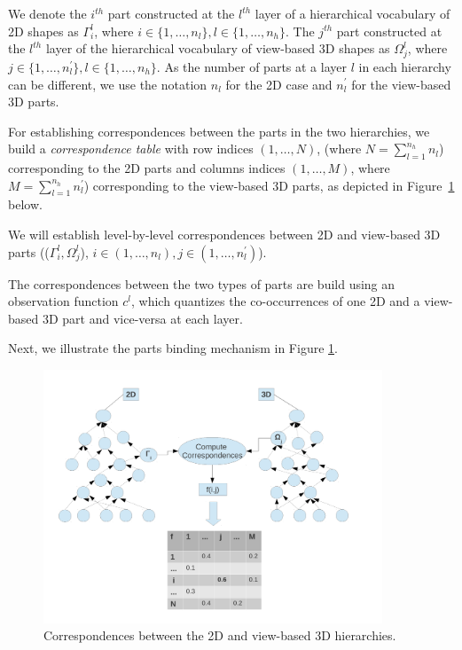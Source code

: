 \documentclass[runningheads]{llncs}
\begin{document}
We denote the $i^{th}$ part constructed at the $l^{th}$ layer of a  hierarchical vocabulary of 2D shapes as $\Gamma_{i}^{l}$, where $i \in \{1,\ldots,n_{l}\}, l \in \{1,\ldots,n_h\}$. The $j^{th}$ part constructed at the $l^{th}$ layer of the  hierarchical vocabulary of view-based 3D shapes as $\Omega_{j}^{l}$, where $j \in \{1,\ldots,n_{l}^{'}\}, {l} \in \{1,\ldots,n_h\}$. As the number of parts at a layer $l$ in each hierarchy can be different, we use the notation $n_l$ for the 2D case and $n_l^{'}$ for the view-based 3D parts. 

For establishing correspondences between the parts in the two hierarchies, we build a \emph{correspondence table} with row indices $(1,\dots,N)$, (where $N=\sum_{l=1}^{n_h} {n_l}$) corresponding to the 2D parts and columns indices $(1,\dots,M)$, where $M=\sum_{l=1}^{n_h} {n_{l}^ {'}}$) corresponding to the view-based 3D parts, as depicted in Figure~\ref{fig:fused-models} below. 

We will establish level-by-level correspondences between 2D and view-based 3D  parts (($\Gamma_{i}^l,\Omega_{j}^l$), $i \in (1,\ldots,n_l), j \in (1,\ldots,n_{l}^{'})$).

The correspondences between the two types of parts are build using an observation function $c^l$, which quantizes the co-occurrences of one 2D and a view-based 3D part and vice-versa at each layer. 

Next, we illustrate the parts binding mechanism in Figure \ref{fig:fused-models}.

\begin{figure}
\begin{center}
\includegraphics[width=0.9\textwidth]{Fused_representation}
\end{center}
\caption{Correspondences between the 2D and view-based 3D hierarchies.}
\label{fig:fused-models}
\end{figure}
\end{document}
